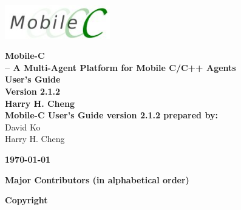 \documentclass[11pt]{report}
\begin{document}
\thispagestyle{empty}
\begin{center}
\includegraphics[width=1.8in]{figure/mobilec_logo.png}


\vspace{0.5in}
{\Huge\sf\bf Mobile-C} \\
\vspace{0.1in}
{\LARGE\sf\bf -- A Multi-Agent Platform for Mobile C/C++ Agents} \\
\vspace{0.4in}
{\LARGE\sf\bf User's Guide} \\
\vspace{0.4in}
{\LARGE\sf\bf Version 2.1.2} \\
\vspace{1.0in}
{\Large\sf\bf Harry H. Cheng} \\
\vspace{1.0in}
{\large\sf\bf Mobile-C User's Guide version 2.1.2 prepared by:} \\
\vspace{0.2in}
David Ko\\
Harry H. Cheng
\vspace{1in}

\vspace{2.0in}
{\large\sf\bf\today}
\end{center}

\pagebreak
\noindent
{\LARGE\sf\bf Major Contributors (in alphabetical order)} \\
{\small

}
\pagebreak


\thispagestyle{empty}
\noindent
{\Large\bf Copyright}\\


\pagebreak
\end{document}
